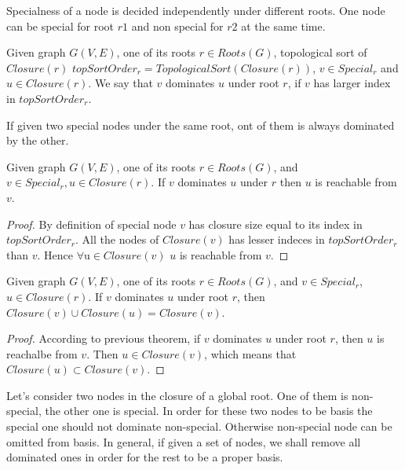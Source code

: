 \documentclass{svproc}
\begin{document}
\begin{remark}
    Specialness of a node is decided independently under different roots. One node can be special for root $r1$ and non special for $r2$ at
    the same time.
\end{remark}

\begin{definition}
    Given graph $G(V, E)$, one of its roots $r \in Roots(G)$, topological sort of $Closure(r)$ $topSortOrder_r = TopologicalSort(Closure(r))$,
    $v \in Special_r$ and $u \in Closure(r)$. We say that $v$ dominates $u$ under root $r$, if  $v$ has larger index in $topSortOrder_r$.
\end{definition}

\begin{remark}
    If given two special nodes under the same root, ont of them is always dominated by the other.
\end{remark}

\begin{theorem}
    Given graph $G(V,E)$, one of its roots $r \in Roots(G)$, and $v \in Special_r, u \in Closure(r)$.
    If $v$ dominates $u$ under $r$ then $u$ is reachable from $v$.
\end{theorem}
\begin{proof}
    By definition of special node $v$ has closure size equal to its index in $topSortOrder_r$. All the nodes of $Closure(v)$ has lesser indeces 
    in $topSortOrder_r$ than $v$. Hence $\forall $u$ \in Closure(v)$ $u$ is reachable from $v$.
\end{proof}

\begin{theorem}
   Given graph $G(V,E)$, one of its roots $r \in Roots(G)$, and $v \in Special_r$, $u \in Closure(r)$. 
   If $v$ dominates $u$ under root $r$, then $Closure(v) \cup Closure(u) = Closure(v)$.
\end{theorem}
\begin{proof}
    According to previous theorem, if $v$ dominates $u$ under root $r$, then $u$ is reachalbe from $v$. Then $u \in Closure(v)$,
    which means that $Closure(u) \subset Closure(v)$.
\end{proof}

Let's consider two nodes in the closure of a global root. One of them is non-special, the other one is special. In order for these two nodes to be basis
the special one should not dominate non-special. Otherwise non-special node can be omitted from basis.
In general, if given a set of nodes, we shall remove all dominated ones in order for the rest to be a proper basis.
\end{document}
